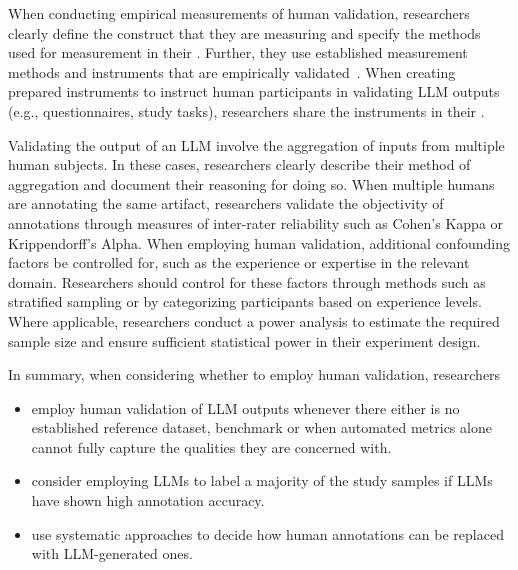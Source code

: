 When conducting empirical measurements of human validation, researchers \must clearly define the construct that they are measuring and \must specify the methods used for measurement in their \paper.
Further, they \should use established measurement methods and instruments that are empirically validated~\cite{DBLP:journals/fcomp/HoffmanMKL23, DBLP:conf/chi/PerrigSB23}.
When creating prepared instruments to instruct human participants in validating LLM outputs (e.g., questionnaires, study tasks), researchers \should share the instruments in their \supplementarymaterial.

Validating the output of an LLM \may involve the aggregation of inputs from multiple human subjects.
In these cases, researchers \should clearly describe their method of aggregation and document their reasoning for doing so.
When multiple humans are annotating the same artifact, researchers \should validate the objectivity of annotations through measures of inter-rater reliability such as Cohen's Kappa or Krippendorff's Alpha.
When employing human validation, additional confounding factors \should be controlled for, such as the experience or expertise in the relevant domain.
Researchers should control for these factors through methods such as stratified sampling or by categorizing participants based on experience levels.
Where applicable, researchers \should conduct a power analysis to estimate the required sample size and ensure sufficient statistical power in their experiment design.

In summary, when considering whether to employ human validation, researchers
\begin{itemize}
    \item \should employ human validation of LLM outputs whenever there either is no established reference dataset, benchmark or when automated metrics alone cannot fully capture the qualities they are concerned with.
    \item \may consider employing LLMs to label a majority of the study samples if LLMs have shown high annotation accuracy.
    \item \should use systematic approaches to decide how human annotations can be replaced with LLM-generated ones.
\end{itemize}

